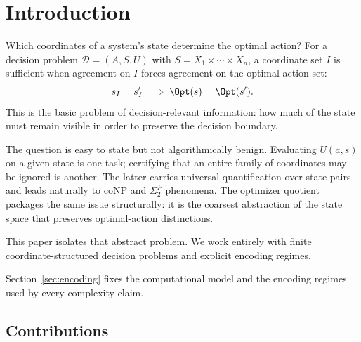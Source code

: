 \section{Introduction}\label{sec:introduction}

Which coordinates of a system's state determine the optimal action? For a decision problem $\mathcal{D}=(A,S,U)$ with $S = X_1 \times \cdots \times X_n$, a coordinate set $I$ is sufficient when agreement on $I$ forces agreement on the optimal-action set:
\[
s_I = s'_I \implies \Opt(s) = \Opt(s').
\]
This is the basic problem of decision-relevant information: how much of the state must remain visible in order to preserve the decision boundary.

The question is easy to state but not algorithmically benign. Evaluating $U(a,s)$ on a given state is one task; certifying that an entire family of coordinates may be ignored is another. The latter carries universal quantification over state pairs and leads naturally to coNP and $\Sigma_2^P$ phenomena. The optimizer quotient packages the same issue structurally: it is the coarsest abstraction of the state space that preserves optimal-action distinctions.

This paper isolates that abstract problem. We work entirely with finite coordinate-structured decision problems and explicit encoding regimes.

Section~\ref{sec:encoding} fixes the computational model and the encoding regimes used by every complexity claim.

\subsection{Contributions}


